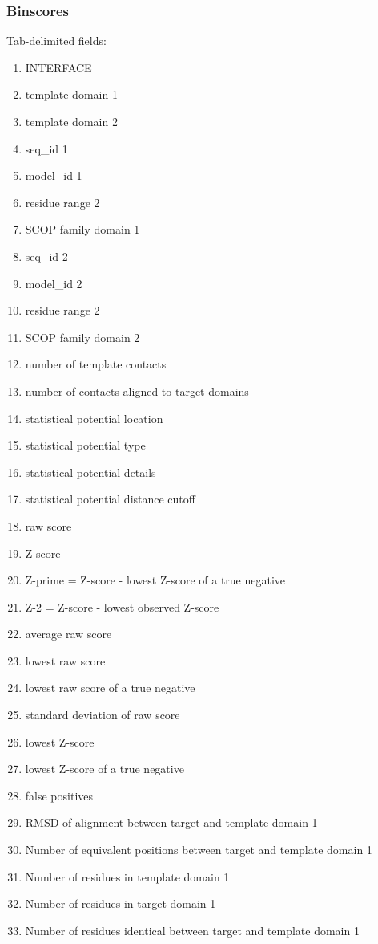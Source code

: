 \documentclass[11pt]{article}
\begin{document}
\subsubsection{Binscores}
Tab-delimited fields:
\begin{enumerate}
\item INTERFACE
\item template domain 1
\item template domain 2
\item seq\_id 1
\item model\_id 1
\item residue range 2
\item SCOP family domain 1
\item seq\_id 2
\item model\_id 2
\item residue range 2
\item SCOP family domain 2
\item number of template contacts
\item number of contacts aligned to target domains
\item statistical potential location
\item statistical potential type
\item statistical potential details
\item statistical potential distance cutoff
\item raw score
\item Z-score
\item Z-prime = Z-score - lowest Z-score of a true negative
\item Z-2 = Z-score - lowest observed Z-score
\item average raw score
\item lowest raw score
\item lowest raw score of a true negative
\item standard deviation of raw score
\item lowest Z-score
\item lowest Z-score of a true negative
\item false positives
\item RMSD of alignment between target and template domain 1
\item Number of equivalent positions between target and template domain 1
\item Number of residues in template domain 1
\item Number of residues in target domain 1
\item Number of residues identical between target and template domain 1

\end{enumerate}
\end{document}
